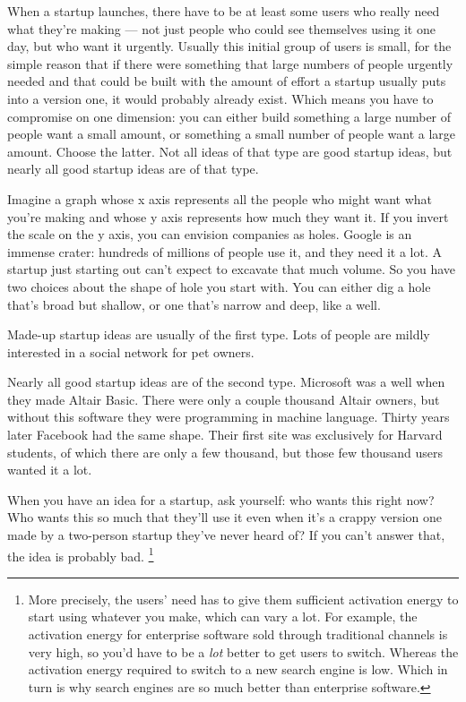 \documentclass[12pt]{book}
\begin{document}
When a startup launches, there have to be at least some users who really
need what they're making --- not just people who could see themselves
using it one day, but who want it urgently. Usually this initial group
of users is small, for the simple reason that if there were something
that large numbers of people urgently needed and that could be built
with the amount of effort a startup usually puts into a version one, it
would probably already exist. Which means you have to compromise on one
dimension: you can either build something a large number of people want
a small amount, or something a small number of people want a large
amount. Choose the latter. Not all ideas of that type are good startup
ideas, but nearly all good startup ideas are of that type.

Imagine a graph whose x axis represents all the people who might want
what you're making and whose y axis represents how much they want it. If
you invert the scale on the y axis, you can envision companies as holes.
Google is an immense crater: hundreds of millions of people use it, and
they need it a lot. A startup just starting out can't expect to excavate
that much volume. So you have two choices about the shape of hole you
start with. You can either dig a hole that's broad but shallow, or one
that's narrow and deep, like a well.

Made-up startup ideas are usually of the first type. Lots of people are
mildly interested in a social network for pet owners.

Nearly all good startup ideas are of the second type. Microsoft was a
well when they made Altair Basic. There were only a couple thousand
Altair owners, but without this software they were programming in
machine language. Thirty years later Facebook had the same shape. Their
first site was exclusively for Harvard students, of which there are only
a few thousand, but those few thousand users wanted it a lot.

When you have an idea for a startup, ask yourself: who wants this right
now? Who wants this so much that they'll use it even when it's a crappy
version one made by a two-person startup they've never heard of? If you
can't answer that, the idea is probably bad. \footnote{More precisely, the users' need has to give them sufficient
activation energy to start using whatever you make, which can vary a
lot. For example, the activation energy for enterprise software sold
through traditional channels is very high, so you'd have to be a
\emph{lot} better to get users to switch. Whereas the activation energy
required to switch to a new search engine is low. Which in turn is why
search engines are so much better than enterprise software.}
\end{document}
